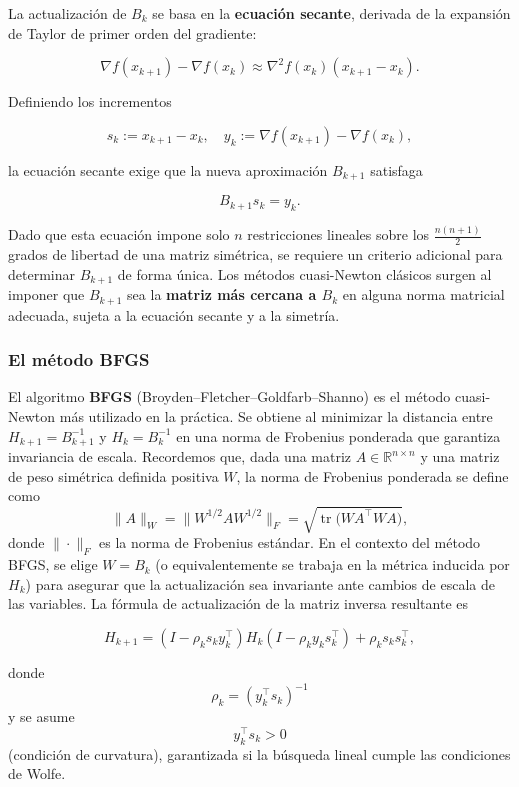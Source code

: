 \documentclass[
  spanish,
  us-letterpaper,
  DIV=11,
  numbers=noendperiod]{scrreprt}
\numberwithin{equation}{section}
\begin{document}
La actualización de \(B_k\) se basa en la \textbf{ecuación secante},
derivada de la expansión de Taylor de primer orden del gradiente:

\[
\nabla f(x_{k+1}) - \nabla f(x_k) \approx \nabla^2 f(x_k)(x_{k+1} - x_k).
\]

Definiendo los incrementos

\[
s_k := x_{k+1} - x_k, \quad y_k := \nabla f(x_{k+1}) - \nabla f(x_k),
\]

la ecuación secante exige que la nueva aproximación \(B_{k+1}\)
satisfaga

\[
B_{k+1} s_k = y_k.
\]

Dado que esta ecuación impone solo \(n\) restricciones lineales sobre
los \(\tfrac{n(n+1)}{2}\) grados de libertad de una matriz simétrica, se
requiere un criterio adicional para determinar \(B_{k+1}\) de forma
única. Los métodos cuasi-Newton clásicos surgen al imponer que
\(B_{k+1}\) sea la \textbf{matriz más cercana a \(B_k\)} en alguna norma
matricial adecuada, sujeta a la ecuación secante y a la simetría.

\subsubsection{El método BFGS}\label{el-muxe9todo-bfgs}

El algoritmo \textbf{BFGS} (Broyden--Fletcher--Goldfarb--Shanno) es el
método cuasi-Newton más utilizado en la práctica. Se obtiene al
minimizar la distancia entre \(H_{k+1} = B_{k+1}^{-1}\) y
\(H_k = B_k^{-1}\) en una norma de Frobenius ponderada que garantiza
invariancia de escala. Recordemos que, dada una matriz
\(A \in \mathbb{R}^{n \times n}\) y una matriz de peso simétrica
definida positiva \(W\), la norma de Frobenius ponderada se define como
\[
\|A\|_W = \|W^{1/2} A W^{1/2}\|_F = \sqrt{\operatorname{tr}\!\big(W A^\top W A\big)},
\] donde \(\|\cdot\|_F\) es la norma de Frobenius estándar. En el
contexto del método BFGS, se elige \(W = B_k\) (o equivalentemente se
trabaja en la métrica inducida por \(H_k\)) para asegurar que la
actualización sea invariante ante cambios de escala de las variables. La
fórmula de actualización de la matriz inversa resultante es

\[
H_{k+1} = (I - \rho_k s_k y_k^\top) H_k (I - \rho_k y_k s_k^\top) + \rho_k s_k s_k^\top,
\]

donde \[\rho_k = (y_k^\top s_k)^{-1}\] y se asume \[y_k^\top s_k > 0\]
(condición de curvatura), garantizada si la búsqueda lineal cumple las
condiciones de Wolfe.
\end{document}
